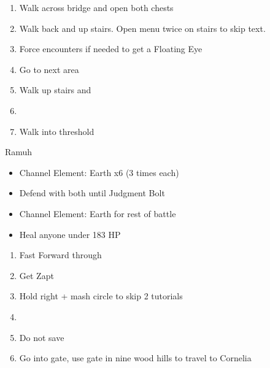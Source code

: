 \begin{enumerate}[resume]
	\item Walk across bridge and open both chests
	\item Walk back and up stairs. Open menu twice on stairs to skip text.
	\item Force encounters if needed to get a Floating Eye
	\item Go to next area
	\item Walk up stairs and \cs
	\item \save
	\item Walk into threshold
\end{enumerate}
\begin{battle}[2562]{Ramuh}
	\begin{itemize}
		\item Channel Element: Earth x6 (3 times each)
		\item Defend with both until Judgment Bolt
		\item Channel Element: Earth for rest of battle
		\item Heal anyone under 183 HP
	\end{itemize}
\end{battle}
\begin{enumerate}[resume]
	\item Fast Forward through \unskippablecs
	\item Get Zapt
	\item Hold right + mash circle to skip 2 tutorials
	\item \cs
	\item Do not save
	\item Go into gate, use gate in nine wood hills to travel to Cornelia
\end{enumerate}